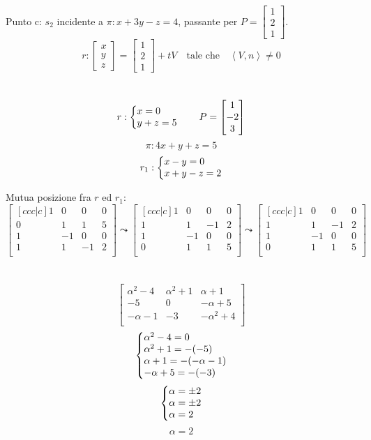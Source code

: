 \documentclass{article}
\makeatletter
\newcommand*{\m}[1]{\begin{bmatrix}#1\end{bmatrix}}
\newcommand*{\sys}[1]{\left\{\begin{array}{@{}l@{}}#1\end{array}\right.}
\makeatother
\begin{document}
Punto c: $s_2$ incidente a $\pi:x+3y-z=4$, passante per $P=\begin{bmatrix}1\\2\\1\end{bmatrix}$.
\[
    r:\m{x\\y\\z} =\m{1\\2\\1}+tV
    \quad\text{tale che}\quad
    \left\langle V,n\right\rangle\ne 0
\]

\section{}
\subsection{}
\[r:\sys{x = 0 \\ y + z = 5} \qquad P = \m{1\\-2\\3}\]
\[\pi:4x+y+z=5\]
\[r_1:\sys{x-y=0\\x+y-z=2}\]

Mutua posizione fra $r$ ed $r_1$:
\[
    \m{
        [ccc|c]
        1&0&0&0\\
        0&1&1&5\\
        1&-1&0&0\\
        1&1&-1&2\\
    }\leadsto\m{
        [ccc|c]
        1&0&0&0\\
        1&1&-1&2\\
        1&-1&0&0\\
        0&1&1&5\\
    }\leadsto\m{
        [ccc|c]
        1&0&0&0\\
        1&1&-1&2\\
        1&-1&0&0\\
        0&1&1&5\\
    }
\]

\section{}
\subsection{}
\[\m{
        \alpha^2-4&\alpha^2+1&\alpha+1\\
        -5&0&-\alpha+5\\
        -\alpha-1&-3&-\alpha^2+4\\
    }\]\[
    \sys{
        \alpha^2-4=0\\
        \alpha^2+1=-(-5)\\
        \alpha+1=-(-\alpha-1)\\
        -\alpha+5=-(-3)
    }\]\[
    \sys{
        \alpha=\pm2\\
        \alpha=\pm2\\
        \alpha=2\\
    }
\]
\[\alpha=2\]
\end{document}
